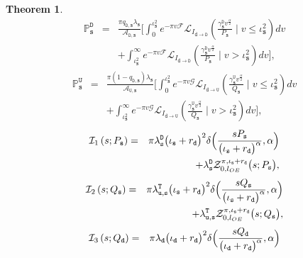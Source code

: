 \documentclass[twocolumn,english]{IEEEtran}
\theoremstyle{plain}
\theoremstyle{definition}
\newtheorem{theorem}{\textbf{Theorem}}
\begin{document}
\begin{theorem}
\begin{eqnarray}
\mathbb{P}_{\mathtt{s}}^{\mathtt{D}} & = & \frac{\pi q_{\mathtt{D,s}}\lambda_{\mathtt{s}}}{\mathcal{A}_{\mathtt{D,s}}}\biggl[\int_{0}^{\iota_{\mathtt{s}}^{2}}e^{-\pi v\mathcal{F}}\mathcal{L}_{I_{\mathtt{d\rightarrow D}}}(\frac{\gamma_{\mathtt{s}}^{\mathtt{D}}v^{\frac{\alpha}{2}}}{P_{\mathtt{s}}}\mid v\leq\iota_{\mathtt{s}}^{2})dv\nonumber \\
 &  & +\int_{\iota_{\mathtt{s}}^{2}}^{\infty}e^{-\pi v\mathcal{F}}\mathcal{L}_{I_{\mathtt{d\rightarrow D}}}(\frac{\gamma_{\mathtt{s}}^{\mathtt{D}}v^{\frac{\alpha}{2}}}{P_{\mathtt{s}}}\mid v>\iota_{\mathtt{s}}^{2})dv\biggr],\label{eq:Small_D}
\end{eqnarray}
\begin{eqnarray}
\mathbb{P}_{\mathtt{s}}^{\mathtt{U}} & = & \frac{\pi\left(1-q_{\mathtt{D,s}}\right)\lambda_{\mathtt{s}}}{\mathcal{A}_{\mathtt{U,s}}}\biggl[\int_{0}^{\iota_{\mathtt{s}}^{2}}e^{-\pi v\mathcal{G}}\mathcal{L}_{I_{\mathtt{d\rightarrow U}}}(\frac{\gamma_{\mathtt{s}}^{\mathtt{U}}v^{\frac{\alpha}{2}}}{Q_{\mathtt{s}}}\mid v\leq\iota_{\mathtt{s}}^{2})dv\nonumber \\
 &  & +\int_{\iota_{\mathtt{s}}^{2}}^{\infty}e^{-\pi v\mathcal{G}}\mathcal{L}_{I_{\mathtt{d\rightarrow U}}}(\frac{\gamma_{\mathtt{s}}^{\mathtt{U}}v^{\frac{\alpha}{2}}}{Q_{\mathtt{s}}}\mid v>\iota_{\mathtt{s}}^{2})dv\biggr],\label{eq:Small_U}
\end{eqnarray}
\begin{eqnarray}
\mathcal{I}_{1}\left(s;P_{\mathtt{s}}\right) & = & \pi\lambda_{\mathtt{s}}^{\mathtt{D}}\bigl(\iota_{\mathtt{s}}+r_{\mathtt{d}}\bigr)^{2}\delta\Bigl(\frac{sP_{\mathtt{s}}}{\bigl(\iota_{\mathtt{s}}+r_{\mathtt{d}}\bigr)^{\alpha}},\alpha\Bigr)\nonumber \\
 &  & +\lambda_{\mathtt{s}}^{\mathtt{D}}\mathcal{Z}_{0,l_{OE}}^{\pi,\iota_{\mathtt{s}}+r_{\mathtt{d}}}\bigl(s;P_{\mathtt{s}}\bigr),\label{eq:I_1}
\end{eqnarray}
\begin{eqnarray}
\mathcal{I}_{2}\left(s;Q_{\mathtt{s}}\right) & = & \pi\lambda_{\mathtt{u,s}}^{\mathtt{T}}\bigl(\iota_{\mathtt{s}}+r_{\mathtt{d}}\bigr)^{2}\delta\Bigl(\frac{sQ_{\mathtt{s}}}{\bigl(\iota_{\mathtt{s}}+r_{\mathtt{d}}\bigr)^{\alpha}},\alpha\Bigr)\nonumber \\
 &  & +\lambda_{\mathtt{u,s}}^{\mathtt{T}}\mathcal{Z}_{0,l_{OE}}^{\pi,\iota_{\mathtt{s}}+r_{\mathtt{d}}}\bigl(s;Q_{\mathtt{s}}\bigr),\label{eq:I_2}
\end{eqnarray}
\begin{eqnarray}
\mathcal{I}_{3}\left(s;Q_{\mathtt{d}}\right) & = & \pi\lambda_{\mathtt{d}}\bigl(\iota_{\mathtt{d}}+r_{\mathtt{d}}\bigr)^{2}\delta\Bigl(\frac{sQ_{\mathtt{d}}}{\bigl(\iota_{\mathtt{d}}+r_{\mathtt{d}}\bigr)^{\alpha}},\alpha\Bigr)\nonumber \\

\end{eqnarray}
\end{theorem}
\end{document}
